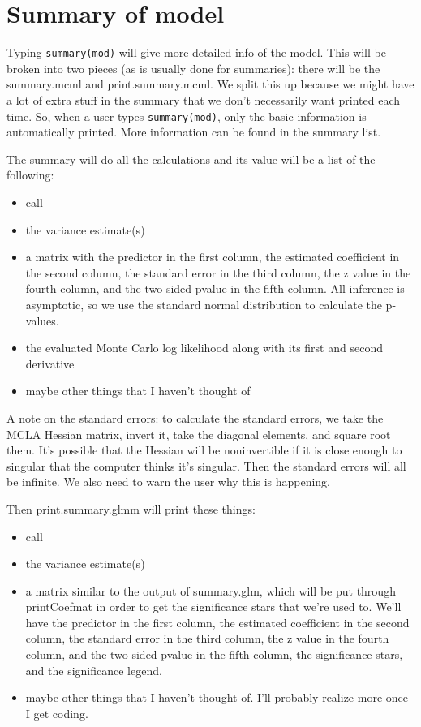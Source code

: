 \documentclass{article}
\begin{document}
\section{Summary of model}
Typing \texttt{summary(mod)} will give more detailed info of the model. This will be broken into two pieces (as is usually done for summaries): there will be the summary.mcml and print.summary.mcml. We split this up because we might have a lot of extra stuff in the summary that we don't necessarily want printed each time. So, when a user types \texttt{summary(mod)}, only the  basic information is automatically printed. More information can be found in the summary list.

The summary will do all the calculations and its value will be a list of the following:
\begin{itemize}
\item call
\item the variance estimate(s)
\item a matrix with the predictor in the first column, the estimated coefficient in the second column, the standard error in the third column, the z value in the fourth column, and the two-sided pvalue  in the fifth column. All inference is asymptotic, so we use the standard normal distribution to calculate the p-values.
\item the evaluated Monte Carlo log likelihood along with its first and second derivative
\item maybe other things that I haven't thought of
\end{itemize}

A note on the standard errors: to calculate the standard errors, we take the MCLA Hessian matrix, invert it, take the diagonal elements, and square root them. It's possible that the Hessian will be noninvertible if it is close enough to singular that the computer thinks it's singular.  Then the standard errors will all be infinite. We also need to warn the user why this is happening.

Then print.summary.glmm will print these things:
\begin{itemize}
\item call
\item the variance estimate(s)
\item a matrix similar to the output of summary.glm, which will be put through printCoefmat in order to get the significance stars that we're used to. We'll have the predictor in the first column, the estimated coefficient in the second column, the standard error in the third column, the z value in the fourth column, and the two-sided pvalue  in the fifth column, the significance stars, and the significance legend.
\item maybe other things that I haven't thought of. I'll probably realize more once I get coding.
\end{itemize}
\end{document}
